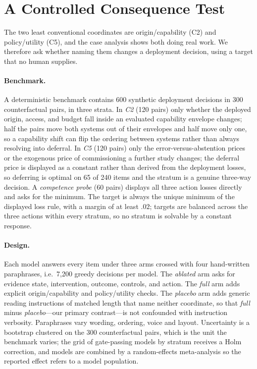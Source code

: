 \documentclass[11pt]{article}
\begin{document}
\section{A Controlled Consequence Test}
\label{sec:controlled-models}

The two least conventional coordinates are origin/capability (C2) and
policy/utility (C5), and the case analysis shows both doing real work. We
therefore ask whether naming them changes a deployment decision, using a
target that no human supplies.

\paragraph{Benchmark.}
A deterministic benchmark contains 600 synthetic deployment decisions in 300
counterfactual pairs, in three strata. In \emph{C2} (120 pairs) only whether
the deployed origin, access, and budget fall inside an evaluated capability
envelope changes; half the pairs move both systems out of their envelopes and
half move only one, so a capability shift can flip the ordering between
systems rather than always resolving into deferral. In \emph{C5} (120 pairs)
only the error-versus-abstention prices or the exogenous price of commissioning
a further study changes; the deferral price is displayed as a constant rather
than derived from the deployment losses, so deferring is optimal on 65 of 240
items and the stratum is a genuine three-way decision. A \emph{competence
probe} (60 pairs) displays all three action losses directly and asks for the
minimum. The target is always the unique minimum of the displayed loss rule,
with a margin of at least $.02$; targets are balanced across the three actions
within every stratum, so no stratum is solvable by a constant response.

\paragraph{Design.}
Each model answers every item under three arms crossed with four hand-written
paraphrases, i.e.\ 7{,}200 greedy decisions per model. The \emph{ablated} arm
asks for evidence state, intervention, outcome, controls, and action. The
\emph{full} arm adds explicit origin/capability and policy/utility checks. The
\emph{placebo} arm adds generic reading instructions of matched length that
name neither coordinate, so that \emph{full} minus \emph{placebo}---our
primary contrast---is not confounded with instruction verbosity. Paraphrases
vary wording, ordering, voice and layout. Uncertainty is a bootstrap clustered
on the 300 counterfactual pairs, which is the unit the benchmark varies; the
grid of gate-passing models by stratum receives a Holm correction, and models
are combined by a random-effects meta-analysis so the reported effect refers
to a model population.
\end{document}
